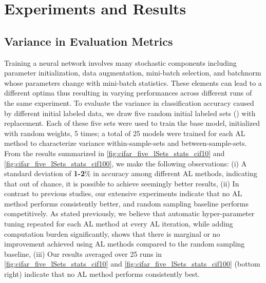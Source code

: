 \documentclass[10pt,twocolumn,letterpaper]{article}
\begin{document}
\section{Experiments and Results}

\subsection{Variance in Evaluation Metrics}
Training a neural network involves many stochastic components including parameter initialization, data augmentation, mini-batch selection, and batchnorm whose parameters change with mini-batch statistics. These elements can lead to a different optima thus resulting in varying performances across different runs of the same experiment. 
To evaluate the variance in classification accuracy caused by different initial labeled data, we draw five random initial labeled sets () with replacement. Each of these five sets were used to train the base model, initialized with random weights, 5 times; a total of 25 models were trained for each AL method to characterize variance within-sample-sets and between-sample-sets. From the results summarized in \cref{fig:cifar_five_lSets_stats_cif10} and \cref{fig:cifar_five_lSets_stats_cif100}, we make the following observations: (i) A standard deviation of \textbf{1-2}\% in accuracy among different AL methods, indicating that out of chance, it is possible to achieve seemingly better results, (ii) In contrast to previous studies, our extensive experiments indicate that no AL method performs consistently better, and random sampling baseline performs competitively. As stated previously, we believe that automatic hyper-parameter tuning repeated for each AL method at every AL iteration, while adding computation burden significantly, shows that there is marginal or no improvement achieved using AL methods compared to the random sampling baseline, (iii) Our results averaged over 25 runs in \cref{fig:cifar_five_lSets_stats_cif10} and \cref{fig:cifar_five_lSets_stats_cif100} (bottom right) indicate that no AL method performs consistently best.
\end{document}
